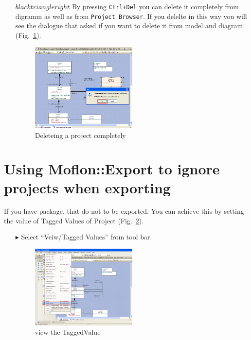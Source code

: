 \begin{enumerate}

\item[$blacktriangleright$] By pressing \texttt{Ctrl+Del} you can delete it
completely from digramm as well as from \texttt{Project Browser}. If you delelte in this way you will see the dialogue
that asked if you want to delete it from model and diagram (Fig.~\ref{fig_DelVsCtrlDel03}).



\begin{figure}[htbp]
\begin{center}
  \includegraphics[width=0.5\textwidth]{pics/tricks/DelVsCtrlDel/DelVsCtrlDel3.png}
  \caption{Deleteing a project completely}  
  \label{fig_DelVsCtrlDel03}
\end{center}
\end{figure}  

\end{enumerate}

\section{Using Moflon::Export to ignore projects when exporting}
If you have package, that do not to be exported. You can achieve this by
setting the value of Tagged Values of
Project (Fig.~\ref{fig_ignoreExportingProject01}).

\begin{enumerate}
\item[$\blacktriangleright$]Select “Veiw/Tagged Values” from tool bar.
\begin{figure}[htbp]
\begin{center}
  \includegraphics[width=0.5\textwidth]{pics/tricks/ignoreExportingProject/ignoreExportingProject1}
  \caption{view the TaggedValue}  
  \label{fig_ignoreExportingProject01}
\end{center}
\end{figure} 


\end{enumerate}


